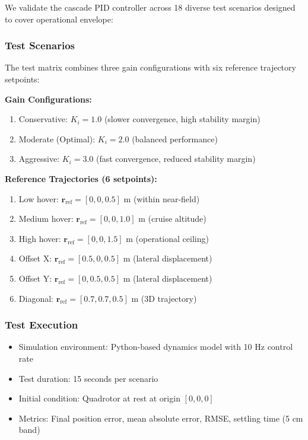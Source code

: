 \documentclass[journal]{IEEEtran}
\begin{document}
We validate the cascade PID controller across 18 diverse test scenarios designed to cover operational envelope:

\subsubsection{Test Scenarios}

The test matrix combines three gain configurations with six reference trajectory setpoints:

\textbf{Gain Configurations:}
\begin{enumerate}
    \item Conservative: $K_i = 1.0$ (slower convergence, high stability margin)
    \item Moderate (Optimal): $K_i = 2.0$ (balanced performance)
    \item Aggressive: $K_i = 3.0$ (fast convergence, reduced stability margin)
\end{enumerate}

\textbf{Reference Trajectories (6 setpoints):}
\begin{enumerate}
    \item Low hover: $\mathbf{r}_{\text{ref}} = [0, 0, 0.5]$ m (within near-field)
    \item Medium hover: $\mathbf{r}_{\text{ref}} = [0, 0, 1.0]$ m (cruise altitude)
    \item High hover: $\mathbf{r}_{\text{ref}} = [0, 0, 1.5]$ m (operational ceiling)
    \item Offset X: $\mathbf{r}_{\text{ref}} = [0.5, 0, 0.5]$ m (lateral displacement)
    \item Offset Y: $\mathbf{r}_{\text{ref}} = [0, 0.5, 0.5]$ m (lateral displacement)
    \item Diagonal: $\mathbf{r}_{\text{ref}} = [0.7, 0.7, 0.5]$ m (3D trajectory)
\end{enumerate}

\subsubsection{Test Execution}

\begin{itemize}
    \item Simulation environment: Python-based dynamics model with 10 Hz control rate
    \item Test duration: 15 seconds per scenario
    \item Initial condition: Quadrotor at rest at origin $[0, 0, 0]$
    \item Metrics: Final position error, mean absolute error, RMSE, settling time (5 cm band)
\end{itemize}
\end{document}

